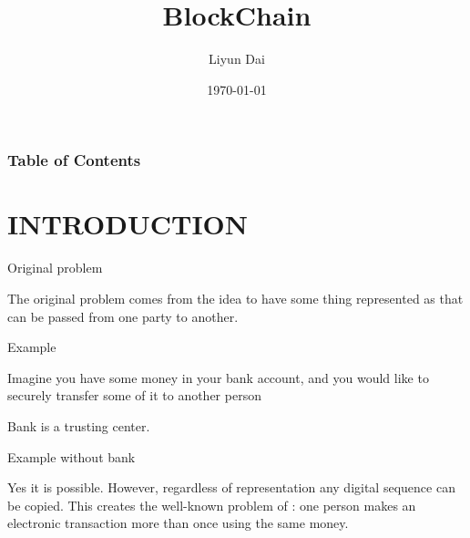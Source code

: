 \documentclass[serif]{beamer}
\title{BlockChain}
\author{ Liyun Dai}
\institute{RISE, Southwest University, Chongqing, China}
\date{\today}
\begin{document}
\maketitle
\begin{frame}
  \frametitle{Table of Contents}
  \tableofcontents[currentsection]
\end{frame}

\section{INTRODUCTION}

\begin{frame}{Original problem}
	\begin{problem}
		The original problem comes from the idea to have some
		thing represented as {\color{red}{digital entity}} that can be passed {\color{red}{securely}}
		from one party to another.
	\end{problem}
\end{frame}

\begin{frame}{Example}
	\begin{example}
		Imagine you have some money in
		your bank account, and you would like to securely transfer
		some of it to another person
	\end{example}
	
	{\Huge Bank is a trusting center.}
\end{frame}

\begin{frame}{Example 	without bank }

	\begin{problem}
		Yes it is possible. However, regardless of representation any digital sequence can be copied.
		This creates the well-known problem of {\color{red}{“double-spending”}}:
		one person makes an electronic transaction more than once
		using the same money.
	\end{problem}
\end{frame}
\end{document}
